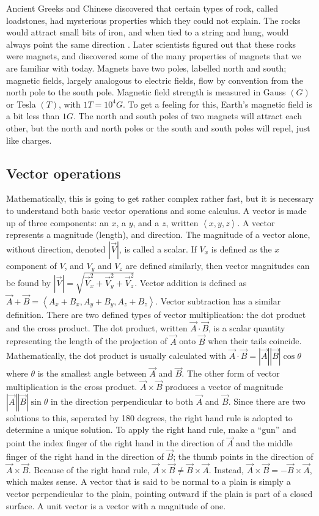 \documentclass[12pt]{article}
\begin{document}
\indent Ancient Greeks and Chinese discovered that certain types of rock, called loadstones, had mysterious properties which they could not explain. The rocks would attract small bits of iron, and when tied to a string and hung, would always point the same direction \cite{magnet}. Later scientists figured out that these rocks were magnets, and discovered some of the many properties of magnets that we are familiar with today. Magnets have two poles, labelled north and south; magnetic fields, largely analogous to electric fields, flow by convention from the north pole to the south pole. Magnetic field strength is measured in Gauss $(G)$ or Tesla $(T)$, with $1T=10^4G$. To get a feeling for this, Earth's magnetic field is a bit less than $1G$. The north and south poles of two magnets will attract each other, but the north and north poles or the south and south poles will repel, just like charges.

\subsection{Vector operations}

\indent Mathematically, this is going to get rather complex rather fast, but it is necessary to understand both basic vector operations and some calculus. A vector is made up of three components: an $x$, a $y$, and a $z$, written $\left\langle x,y,z\right\rangle$. A vector represents a magnitude (length), and direction. The magnitude of a vector alone, without direction, denoted $|\vec{V}|$, is called a scalar. If $V_x$ is defined as the $x$ component of $V$, and $V_y$ and $V_z$ are defined similarly, then vector magnitudes can be found by $|\vec{V}|=\sqrt{\vec{V}_x^2+\vec{V}_y^2+\vec{V}_z^2}$. Vector addition is defined as $\vec{A}+\vec{B}=\left\langle A_x+B_x,  A_y+B_y, A_z+B_z \right\rangle$. Vector subtraction has a similar definition. There are two defined types of vector multiplication: the dot product and the cross product. The dot product, written $\vec{A}\cdot \vec{B}$, is a scalar quantity representing the length of the projection of $\vec{A}$ onto $\vec{B}$ when their tails coincide. Mathematically, the dot product is usually calculated with $\vec{A}\cdot \vec{B}=|\vec{A}||\vec{B}|\cos{\theta}$ where $\theta$ is the smallest angle between $\vec{A}$ and $\vec{B}$. The other form of vector multiplication is the cross product. $\vec{A}\times \vec{B}$ produces a vector of magnitude $|\vec{A}||\vec{B}|\sin{\theta}$ in the direction perpendicular to both $\vec{A}$ and $\vec{B}$. Since there are two solutions to this, seperated by 180 degrees, the right hand rule is adopted to determine a unique solution. To apply the right hand rule, make a ``gun'' and point the index finger of the right hand in the direction of $\vec{A}$ and the middle finger of the right hand in the direction of $\vec{B}$; the thumb points in the direction of $\vec{A} \times \vec{B}$. Because of the right hand rule, $\vec{A} \times \vec{B} \neq \vec{B} \times \vec{A}$. Instead, $\vec{A} \times \vec{B} = -\vec{B} \times \vec{A}$, which makes sense. A vector that is said to be normal to a plain is simply a vector perpendicular to the plain, pointing outward if the plain is part of a closed surface. A unit vector is a vector with a magnitude of one.
\end{document}
